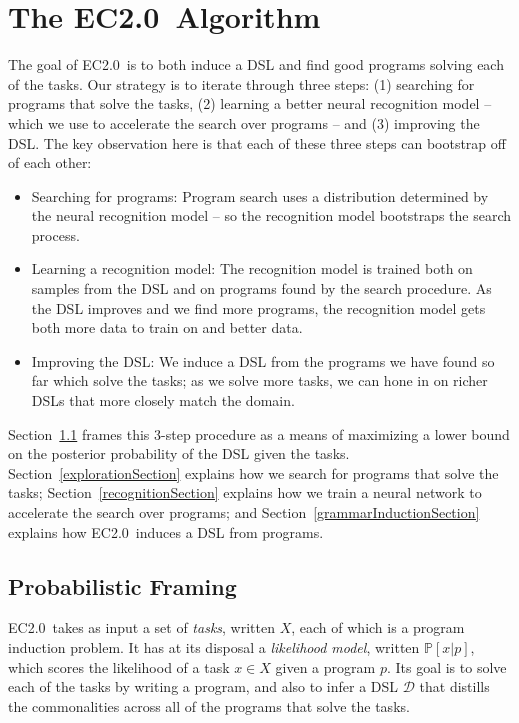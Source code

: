 \documentclass{article}
\newcommand{\system}{EC2.0~}
\newcommand{\probability}{\mathds{P}} %
\begin{document}
\section{The \system Algorithm}

The goal of \system is to both induce a DSL and find good programs solving each of the tasks.
Our strategy is to iterate through three steps: (1) searching for programs that
solve the tasks, (2) learning a better neural recognition model -- which we use
to accelerate the search over programs -- and (3) improving the DSL.
The key observation here is that each of these three steps can bootstrap off of each other:

\begin{itemize}
  \item Searching for programs: Program search uses a distribution determined by the neural recognition model --
  so the recognition model bootstraps the search process.
  \item Learning a recognition model: The recognition model is trained both on samples from the DSL and on programs found by the search procedure. As the DSL improves and we find more programs, the recognition model gets both more data to train on and better data.
  \item Improving the DSL: We induce a DSL from the programs we have found so far which solve the tasks;
  as we solve more tasks, we can hone in on richer DSLs that more closely match the domain.
\end{itemize}

Section~\ref{mathematicalFraming} frames this 3-step procedure as
a means of maximizing a lower bound on the posterior probability of the DSL given the tasks.
Section~\ref{explorationSection} explains how we search for programs that solve the tasks;
Section~\ref{recognitionSection} explains how we train a neural network to accelerate the search over programs; and
Section~\ref{grammarInductionSection} explains how \system induces a DSL from programs.

\subsection{Probabilistic Framing}\label{mathematicalFraming}

\system takes as input a set of \emph{tasks}, written $X$, each of which is a program induction problem.
It has at its disposal a \emph{likelihood model}, written $\probability[x|p]$, which scores the likelihood of a task $x\in X$ given a program $p$.
Its goal is to solve each of the tasks by writing a program,
and also to infer a DSL $\mathcal{D}$ that distills the commonalities across all of the programs that solve the tasks.
\end{document}
